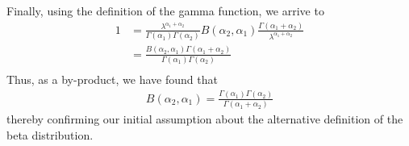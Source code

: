\documentclass[12pt]{article}
\begin{document}
Finally, using the definition of the gamma function, we arrive to
\begin{equation}
	\begin{split}
		1	&=	\frac{\lambda^{\alpha_1+\alpha_2}}{\Gamma(\alpha_1) \Gamma(\alpha_2)} B(\alpha_2,\alpha_1) \frac{\Gamma({\alpha_1+\alpha_2})}{\lambda^{\alpha_1+\alpha_2}}\\
			&=	\frac{B(\alpha_2,\alpha_1) \Gamma({\alpha_1+\alpha_2}) }{\Gamma(\alpha_1) \Gamma(\alpha_2)}\\
	\end{split}
\end{equation}
Thus, as a by-product, we have found that
\begin{equation}\label{eq:specialcases:beta:beta}
	\begin{split}
		B(\alpha_2,\alpha_1) = \frac{\Gamma(\alpha_1) \Gamma(\alpha_2)}{\Gamma({\alpha_1+\alpha_2})}
	\end{split}
\end{equation}
thereby confirming our initial assumption about the alternative definition of the beta distribution.


\pagebreak
\end{document}
